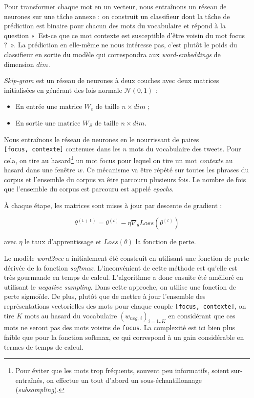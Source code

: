 \documentclass[10pt,french,french]{article}
\let\rmarkdownfootnote\footnote%
\def\footnote{\protect\rmarkdownfootnote}
\begin{document}
Pour transformer chaque mot en un vecteur, nous entraînons un réseau de neurones sur une tâche annexe : on construit un classifieur dont la tâche de prédiction est binaire pour chacun des mots du vocabulaire et répond à la question «~Est-ce que ce mot contexte est susceptible d'être voisin du mot focus ?~».
La prédiction en elle-même ne nous intéresse pas, c'est plutôt le poids du classifieur en sortie du modèle qui correspondra aux \emph{word-embeddings} de dimension \(dim\).

\emph{Skip-gram} est un réseau de neurones à deux couches avec deux matrices initialisées en générant des lois normale \(\mathcal N(0,1)\) :

\begin{itemize}
\item
  En entrée une matrice \(W_e\) de taille \(n\times dim\) ;
\item
  En sortie une matrice \(W_S\) de taille \(n\times dim\).
\end{itemize}

Nous entraînons le réseau de neurones en le nourrissant de paires \texttt{{[}focus,\ contexte{]}} contenues dans les \(n\) mots du vocabulaire des tweets.
Pour cela, on tire au hasard\footnote{Pour éviter que les mots trop fréquents, souvent peu informatifs, soient sur-entraînés, on effectue un tout d'abord un sous-échantillonnage (\emph{subsampling}).} un mot focus pour lequel on tire un mot \emph{contexte} au hasard dans une fenêtre \(w\).
Ce mécanisme va être répété sur toutes les phrases du corpus et l'ensemble du corpus va être parcouru plusieurs fois. Le nombre de fois que l'ensemble du corpus est parcouru est appelé \emph{epochs}.

À chaque étape, les matrices sont mises à jour par descente de gradient :

\[\theta^{(t+1)} = \theta^{(t)} - \eta \nabla_\theta Loss(\theta^{(t)})\]

avec \(\eta\) le taux d'apprentissage et \(Loss(\theta)\) la fonction de perte.

Le modèle \emph{word2vec} a initialement été construit en utilisant une fonction de perte dérivée de la fonction \emph{softmax}.
L'inconvénient de cette méthode est qu'elle est très gourmande en temps de calcul.
L'algorithme a donc ensuite été amélioré en utilisant le \emph{negative sampling}.
Dans cette approche, on utilise une fonction de perte sigmoïde. De plus, plutôt que de mettre à jour l'ensemble des représentations vectorielles des mots pour chaque couple \texttt{{[}focus,\ contexte{]}}, on tire \(K\) mots au hasard du vocabulaire \((w_{neg,\,i})_{i=1..K}\) en considérant que ces mots ne seront pas des mots voisins de \texttt{focus}.
La complexité est ici bien plus faible que pour la fonction softmax, ce qui correspond à un gain considérable en termes de temps de calcul.
\end{document}
